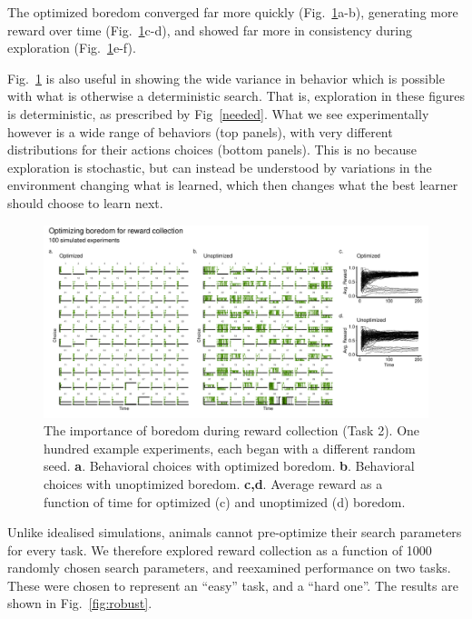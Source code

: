 The optimized boredom converged far more quickly (Fig.~\ref{fig:boredom2}a-b), generating more reward over time (Fig.~\ref{fig:boredom2}c-d), and showed far more in consistency during exploration (Fig.~\ref{fig:boredom2}e-f). 

Fig.~\ref{fig:boredom2} is also useful in showing the wide variance in behavior which is possible with what is otherwise a deterministic search. That is, exploration in these figures is deterministic, as prescribed by Fig~\ref{needed}. What we see experimentally however is a wide range of behaviors (top panels), with very different distributions for their actions choices (bottom panels). This is no because exploration is stochastic, but can instead be understood by variations in the environment changing what is learned, which then changes what the best learner should choose to learn next. 

\begin{figure}
	\begin{fullwidth}
	\includegraphics[width=.9\linewidth]{img/boredom2.pdf} 
	\caption{The importance of boredom during reward collection (Task 2). One hundred example experiments, each began with a different random seed. 
	\textbf{a}. Behavioral choices with optimized boredom.
	\textbf{b}. Behavioral choices with unoptimized boredom.
	\textbf{c,d}. Average reward as a function of time for optimized (c) and unoptimized (d) boredom.
	}
	\label{fig:boredom2} 
	\end{fullwidth}
\end{figure}

Unlike idealised simulations, animals cannot pre-optimize their search parameters for every task. We therefore explored reward collection as a function of 1000 randomly chosen search parameters, and reexamined performance on two tasks. These were chosen to represent an ``easy'' task, and a ``hard one''. The results are shown in Fig.~\ref{fig:robust}. 

